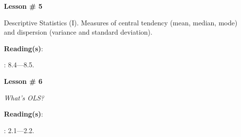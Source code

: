 \documentclass[letterpaper]{article}
\renewenvironment{itemize}{
  \begin{list}{}{
    \setlength{\leftmargin}{1.5em}
  }
}{
  \end{list}
}
\begin{document}
\begin{enumerate}
	\item {}

			\begin{itemize} 
				\item[$\bullet$] {\bf Lesson \# 5} %
					\begin{itemize} 
				\item[$\circ$] Descriptive Statistics (I). Measures of central tendency (mean, median, mode) and dispersion (variance and standard deviation). %
          \item[$\circ$] {\bf Reading(s)}: 
          \begin{itemize}
            \item[$\diamond$] \textcite{Gill:2006wp}: 8.4---8.5.
          \end{itemize}
					\end{itemize}
			\end{itemize}






	\item {}


			\begin{itemize} 
				\item[$\bullet$] {\bf Lesson \# 6} %
					\begin{itemize} 
						\item[$\circ$] \emph{What's OLS?}
						\item[$\circ$] {\bf Reading(s)}: 
							\begin{itemize}
								\item[$\diamond$] \textcite{Wooldridge2002}: 2.1---2.2.
							\end{itemize}
					\end{itemize}
			\end{itemize}




\end{enumerate}
\end{document}
